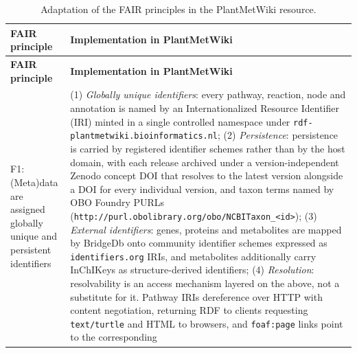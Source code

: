 \documentclass[11pt,a4paper]{article}
\begin{document}
{\footnotesize
\begin{longtable}{p{} p{}}
\caption{Adaptation of the FAIR principles in the PlantMetWiki resource.}
\label{tab:fair}\\
\toprule
\textbf{FAIR principle} & \textbf{Implementation in PlantMetWiki} \\
\midrule
\endfirsthead
\toprule
\textbf{FAIR principle} & \textbf{Implementation in PlantMetWiki} \\
\midrule
\endhead
\bottomrule
\endfoot
F1: (Meta)data are assigned globally unique and persistent identifiers &
(1) \textit{Globally unique identifiers}: every pathway, reaction, node and annotation is named
by an Internationalized Resource Identifier (IRI) minted in a single controlled namespace under
\texttt{rdf-\allowbreak{}plantmetwiki.\allowbreak{}bioinformatics.\allowbreak{}nl}; (2)
\textit{Persistence}: persistence is carried by registered identifier schemes rather than by the
host domain, with each release archived under a version-independent Zenodo concept DOI that resolves
to the latest version alongside a DOI for every individual version, and taxon terms named by OBO
Foundry PURLs
(\texttt{http://\allowbreak{}purl.\allowbreak{}obolibrary.\allowbreak{}org/\allowbreak{}obo/\allowbreak{}NCBITaxon\_\allowbreak{}<id>});
(3) \textit{External identifiers}: genes, proteins and metabolites are mapped by BridgeDb onto
community identifier schemes expressed as \texttt{identifiers.\allowbreak{}org} IRIs, and
metabolites additionally carry InChIKeys as structure-derived identifiers; (4) \textit{Resolution}:
resolvability is an access mechanism layered on the above, not a substitute for it. Pathway IRIs
dereference over HTTP with content negotiation, returning RDF to clients requesting
\texttt{text/turtle} and HTML to browsers, and \texttt{foaf:page} links point to the corresponding

\end{longtable}}
\end{document}
